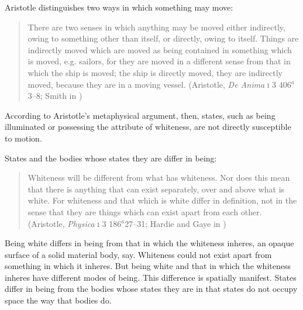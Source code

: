 Aristotle distinguishes two ways in which something may move: 
\begin{quote}
	There are two senses in which anything may be moved either indirectly, owing to something other than itself, or directly, owing to itself. Things are indirectly moved which are moved as being contained in something which is moved, e.g. sailors, for they are moved in a different sense from that in which the ship is moved; the ship is directly moved, they are indirectly moved, because they are in a moving vessel. (Aristotle, \emph{De Anima} \textsc{i} 3 406\( ^{a} \)3--8; Smith in \citealt[9]{Barnes:1984uq})
\end{quote}
According to Aristotle's metaphysical argument, then, states, such as being illuminated or possessing the attribute of whiteness, are not directly susceptible to motion.

States and the bodies whose states they are differ in being:
\begin{quote}
	Whiteness will be different from what has whiteness. Nor does this mean that there is anything that can exist separately, over and above what is white. For whiteness and that which is white differ in definition, not in the sense that they are things which can exist apart from each other. (Aristotle, \emph{Physica} \textsc{i} 3 186\( ^{a} \)27--31; Hardie and Gaye in \citealt[6]{Barnes:1984uq})
\end{quote}
Being white differs in being from that in which the whiteness inheres, an opaque surface of a solid material body, say. Whiteness could not exist apart from something in which it inheres. But being white and that in which the whiteness inheres have different modes of being. This difference is spatially manifest. States differ in being from the bodies whose states they are in that states do not occupy space the way that bodies do. 


